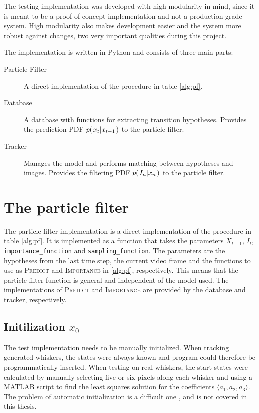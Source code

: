 The testing implementation was developed with high modularity in mind,
since it is meant to be a proof-of-concept implementation and not a
production grade system. High modularity also makes development easier
and the system more robust against changes, two very important
qualities during this project.

The implementation is written in Python and consists of three main parts:
\begin{description}
  \item[Particle Filter] A direct  implementation of the procedure in
    table \ref{alg:pf}.
  \item[Database] A database with functions for extracting transition
    hypotheses. Provides the prediction PDF $p{(\left. x_t \middle\vert x_{t-1} \right.)}$ to the
    particle filter.
  \item[Tracker] Manages the model and performs matching between
    hypotheses and images. Provides the filtering PDF
    $p{(\left. I_n \middle\vert x_n \right.)}$ to the particle filter.
\end{description}

\section{The particle filter}
The particle filter implementation is a direct implementation of the
procedure in table \ref{alg:pf}. It is implemented as a function that
takes the parameters $X_{t-1}$, $I_t$, \texttt{importance\_function} and
\texttt{sampling\_function}. The parameters are the hypotheses from
the last time step, the current video frame and the functions to use
as \textsc{Predict} and \textsc{Importance} in \ref{alg:pf},
respectively. This means that the particle filter function is general
and independent of the model used. The implementations of
\textsc{Predict} and \textsc{Importance} are provided by the database
and tracker, respectively.

\subsection{Initilization $x_0$}
The test implementation needs to be manually initialized. When
tracking generated whiskers, the states were always known and program
could therefore be programmatically inserted. When testing on real
whiskers, the start states were calculated by manually selecting five
or six pixels along each whisker and using a MATLAB script to find the
least squares solution for the coefficients $\langle a_1, a_2, a_3
\rangle$. The problem of automatic initialization is a difficult one
\cite{Hedvig}, and is not covered in this thesis.

